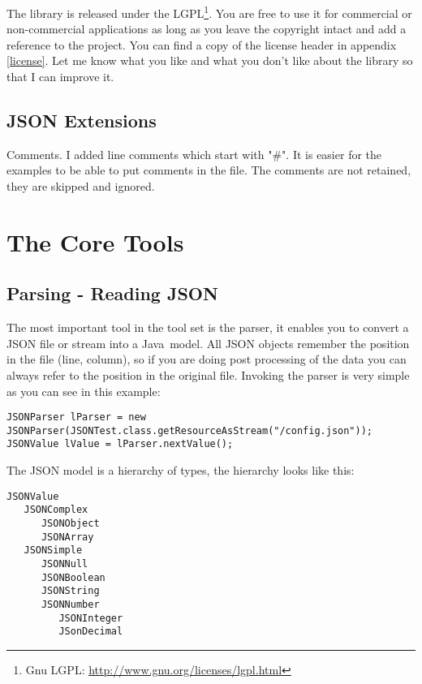 \documentclass[a4paper]{article}
\newcommand{\java}{Java}
\begin{document}
The library is released under the LGPL\footnote{Gnu LGPL: \url{http://www.gnu.org/licenses/lgpl.html}}. You are free to use it for commercial or non-commercial applications as long as you leave the copyright intact and add a reference to the project. You can find a copy of the license header in appendix \ref{license}. 
Let me know what you like and what you don't like about the library so that I can improve it.

\subsection{JSON Extensions}

Comments. I added line comments which start with "\#". It is easier for the examples to be able to put comments in the file. The comments are not retained, they are skipped and ignored.

\section{The Core Tools}

\subsection{Parsing - Reading JSON}

The most important tool in the tool set is the parser, it enables you to convert a JSON file or stream into a \java\ model. All JSON objects remember the position in the file (line, column), so if you are doing post processing of the data you can always refer to the position in the original file. 
Invoking the parser is very simple as you can see in this example:

\medskip
\begin{lstlisting}[basicstyle=\ttfamily\scriptsize{}]
JSONParser lParser = new JSONParser(JSONTest.class.getResourceAsStream("/config.json"));
JSONValue lValue = lParser.nextValue();
\end{lstlisting}
\medskip

The JSON model is a hierarchy of types, the hierarchy looks like this:

\medskip
\begin{lstlisting}
JSONValue
   JSONComplex
      JSONObject
      JSONArray
   JSONSimple
      JSONNull
      JSONBoolean
      JSONString
      JSONNumber
         JSONInteger
         JSonDecimal
\end{lstlisting}
\medskip
\end{document}
